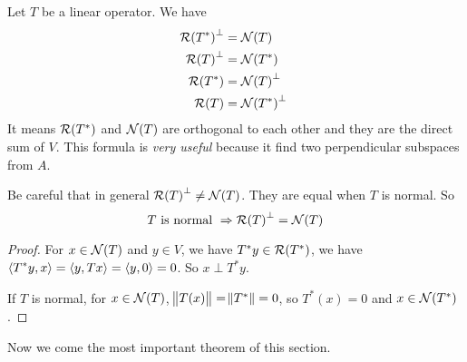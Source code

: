 \begin{theorem}
    Let $T$ be a linear operator. We have
    \begin{equation}
        \begin{aligned}
            \rangespace{T^*}^\perp &= \nullspace{T} \\
            \rangespace{T}^\perp &= \nullspace{T^*} \\
            \rangespace{T^*} &= \nullspace{T}^\perp \\
            \rangespace{T} &= \nullspace{T^*}^\perp \
        \end{aligned}        
    \end{equation}
    It means $\rangespace{T^*}$ and $\nullspace{T}$ are orthogonal to each other and they are the direct sum of $V$. This formula is \emph{very useful} because it find two perpendicular subspaces from $A$.
    
    Be careful that in general $\rangespace{T}^\perp \neq \nullspace{T}$. They are equal when $T$ is normal. So
    \begin{equation}
        T \text{ is normal } \Rightarrow \rangespace{T}^\perp = \nullspace{T}
    \end{equation}    
\end{theorem}
\begin{proof}
    For $x \in \nullspace{T}$ and $y \in V$, we have $T^*y \in \rangespace{T^*}$, we have $\innerproduct{T^*y}{x} = \innerproduct{y}{Tx} = \innerproduct{y}{0} = 0$. So $x \perp T^* y$.
    
    
    If $T$ is normal, for $x \in \nullspace{T}$, $\norm{T(x)} = \norm{T^*} = 0$, so $T^*(x) = 0$ and $x \in \nullspace{T^*}$.
\end{proof}


Now we come the most important theorem of this section.

